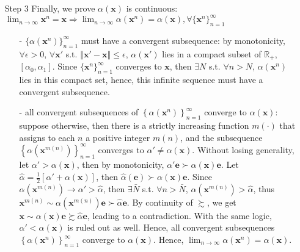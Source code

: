 \begin{enumerate}
\begin{enumerate}
        \item[Step 3] Finally, we prove $\alpha(\mathbf{x})$ is continuous: $\lim_{n\rightarrow\infty}\mathbf{x}^n=\mathbf{x}\Rightarrow \lim_{n\rightarrow\infty}\alpha(\mathbf{x}^n)=\alpha(\mathbf{x}),\forall \{\mathbf{x}^n\}^{\infty}_{n=1}$
        \begin{enumerate}
            \item[-] $\{\alpha(\mathbf{x}^n)\}^{\infty}_{n=1}$ must have a convergent subsequence: by monotonicity, $\forall\epsilon>0$, $\forall \mathbf{x}'$ s.t. $\left\Vert\mathbf{x}'-\mathbf{x}\right\Vert\leq \epsilon$, $\alpha(\mathbf{x}')$ lies in a compact subset of $\mathbb{R}_+$, $[\alpha_0,\alpha_1]$. Since $\{\mathbf{x}^n\}^{\infty}_{n=1}$ converges to $\mathbf{x}$, then $\exists N$ s.t. $\forall n>N$, $\alpha(\mathbf{x}^n)$ lies in this compact set, hence, this infinite sequence must have a convergent subsequence.
            \item[-] all convergent subsequences of $\left\{\alpha(\mathbf{x}^n)\right\}^{\infty}_{n=1}$ converge to $\alpha(\mathbf{x})$: suppose otherwise, then there is a strictly increasing function $m(\cdot)$ that assigns to each $n$ a positive integer $m(n)$, and the subsequence $\left\{\alpha(\mathbf{x}^{m(n)}) \right\}^{\infty}_{n=1}$ converges to $\alpha'\neq \alpha(\mathbf{x})$. Without losing generality, let $\alpha'>\alpha(\mathbf{x})$, then by monotonicity, $\alpha'\mathbf{e}\succ \alpha(\mathbf{x})\mathbf{e}$. 
            Let $\hat{\alpha}=\frac{1}{2}[\alpha'+\alpha(\mathbf{x})]$, then $\hat{\alpha}(\mathbf{e})\succ \alpha(\mathbf{x})\mathbf{e}$. Since $\alpha(\mathbf{x}^{m(n)})\rightarrow\alpha'>\hat{\alpha}$, then $\exists \bar{N}$ s.t. $\forall n>\bar{N}$, $\alpha(\mathbf{x}^{m(n)})>\hat{\alpha}$, thus $\mathbf{x}^{m(n)}\sim \alpha(\mathbf{x}^{m(n)})\mathbf{e}\succ \hat{\alpha}\mathbf{e}$. By continuity of $\succsim$, we get $\mathbf{x}\sim \alpha(\mathbf{x})\mathbf{e}\succsim \hat{\alpha}\mathbf{e}$, leading to a contradiction. 
            With the same logic, $\alpha'<\alpha(\mathbf{x})$ is ruled out as well. Hence, all convergent subsequences $\left\{\alpha(\mathbf{x}^n)\right\}^{\infty}_{n=1}$ converge to $\alpha(\mathbf{x})$. Hence, $\lim_{n\rightarrow\infty}\alpha(\mathbf{x}^n)=\alpha(\mathbf{x})$.
        \end{enumerate}
    \end{enumerate}
\end{enumerate}

